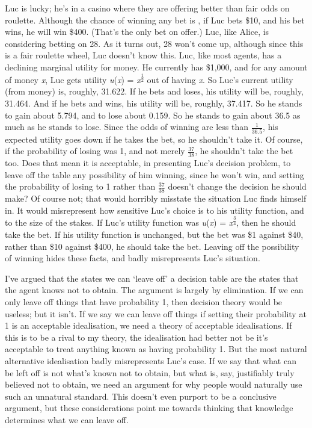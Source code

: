 \documentclass[
  11pt,
  letterpaper,
  DIV=11,
  numbers=noendperiod,
  twoside]{scrartcl}
\begin{document}
Luc is lucky; he's in a casino where they are offering better than fair
odds on roulette. Although the chance of winning any bet is , if Luc
bets \$10, and his bet wins, he will win \$400. (That's the only bet on
offer.) Luc, like Alice, is considering betting on 28. As it turns out,
28 won't come up, although since this is a fair roulette wheel, Luc
doesn't know this. Luc, like most agents, has a declining marginal
utility for money. He currently has \$1,000, and for any amount of money
\emph{x}, Luc gets utility \emph{u}(\emph{x}) =
\emph{x}\textsuperscript{\(\frac{1}{2}\)} out of having \emph{x}. So
Luc's current utility (from money) is, roughly, 31.622. If he bets and
loses, his utility will be, roughly, 31.464. And if he bets and wins,
his utility will be, roughly, 37.417. So he stands to gain about 5.794,
and to lose about 0.159. So he stands to gain about 36.5 as much as he
stands to lose. Since the odds of winning are less than
\(\frac{1}{36.5}\), his expected utility goes down if he takes the bet,
so he shouldn't take it. Of course, if the probability of losing was 1,
and not merely \(\frac{37}{38}\), he shouldn't take the bet too. Does
that mean it is acceptable, in presenting Luc's decision problem, to
leave off the table any possibility of him winning, since he won't win,
and setting the probability of losing to 1 rather than \(\frac{37}{38}\)
doesn't change the decision he should make? Of course not; that would
horribly misstate the situation Luc finds himself in. It would
misrepresent how sensitive Luc's choice is to his utility function, and
to the size of the stakes. If Luc's utility function was
\emph{u}(\emph{x}) = \emph{x}\textsuperscript{\(\frac{3}{4}\)}, then he
should take the bet. If his utility function is unchanged, but the bet
was \$1 against \$40, rather than \$10 against \$400, he should take the
bet. Leaving off the possibility of winning hides these facts, and badly
misrepresents Luc's situation.

I've argued that the states we can `leave off' a decision table are the
states that the agent knows not to obtain. The argument is largely by
elimination. If we can only leave off things that have probability 1,
then decision theory would be useless; but it isn't. If we say we can
leave off things if setting their probability at 1 is an acceptable
idealisation, we need a theory of acceptable idealisations. If this is
to be a rival to my theory, the idealisation had better not be it's
acceptable to treat anything known as having probability 1. But the most
natural alternative idealisation badly misrepresents Luc's case. If we
say that what can be left off is not what's known not to obtain, but
what is, say, justifiably truly believed not to obtain, we need an
argument for why people would naturally use such an unnatural standard.
This doesn't even purport to be a conclusive argument, but these
considerations point me towards thinking that knowledge determines what
we can leave off.
\end{document}
